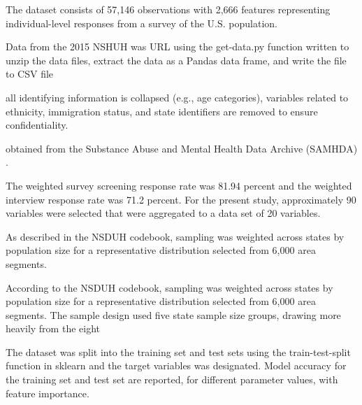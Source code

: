 \documentclass[sigconf]{acmart}
\begin{document}
The dataset consists 
of 57,146 observations with 2,666 features representing individual-level 
responses from a survey of the U.S. population.


Data from the 2015 NSHUH was  URL using the get-data.py 
function written to unzip the data files, extract the data as a Pandas data 
frame, and write the file to CSV file

all identifying information is collapsed (e.g., age categories), 
variables related to ethnicity, immigration status, and state identifiers 
are removed to ensure confidentiality.

obtained from the Substance Abuse and Mental Health 
Data Archive (SAMHDA) \cite{samhsa16}.

The weighted survey screening response rate was 81.94 percent and the weighted 
interview response rate was 71.2 percent. For the present study, approximately
90 variables were selected that were aggregated to a data set of 20 variables. 

As described in the NSDUH codebook, sampling was weighted across states by 
population size for a representative distribution selected from 6,000 area segments. 

According 
to the NSDUH codebook, sampling was weighted across states by population size 
for a representative distribution selected from 6,000 area segments. The sample 
design used five state sample size groups, drawing more heavily from the eight 



The dataset was split into the training set and test 
sets using the train-test-split function in sklearn and the target variables 
was designated. Model accuracy for the training set and test set are reported, 
for different parameter values, with feature importance. 
\end{document}
